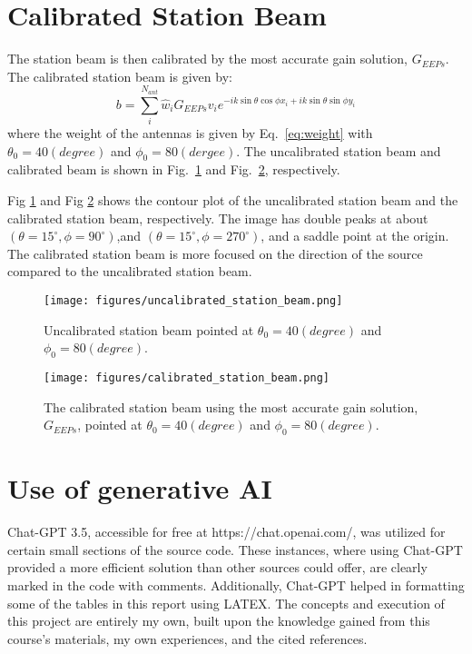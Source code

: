\documentclass[10pt,a4paper,twocolumn]{paper}
\begin{document}
\section{Calibrated Station Beam}
The station beam is then calibrated by the most accurate gain solution, $G_{EEPs}$. The calibrated station beam is given by:
\begin{equation}
    b = \sum_{i}^{N_{ant}} \hat{w}_i G_{EEPs} v_i e^{-ik\sin\theta\cos\phi x_i + ik\sin\theta\sin\phi y_i}
    \label{eq:station_beam}
\end{equation}
where the weight of the antennas is given by Eq.~\ref{eq:weight} with $\theta_0 = 40(degree)$ and $\phi_0 = 80(dergee)$. The uncalibrated station beam and calibrated beam is shown in Fig.~\ref{fig:uncalibrated_station_beam} and Fig.~\ref{fig:calibrated_station_beam}, respectively.

Fig \ref{fig:uncalibrated_station_beam} and Fig \ref{fig:calibrated_station_beam} shows the contour plot of the uncalibrated station beam and the calibrated station beam, respectively. The image has double peaks at about $(\theta = 15^{\circ}, \phi = 90^{\circ})$,and $(\theta = 15^{\circ}, \phi = 270^{\circ})$, and a saddle point at the origin. The calibrated station beam is more focused on the direction of the source compared to the uncalibrated station beam.

\begin{figure}[H]
    \centering
    \texttt{[image: figures/uncalibrated\_station\_beam.png]}
    \caption{Uncalibrated station beam pointed at $\theta_0 = 40(degree)$ and $\phi_0 = 80(degree)$.}
    \label{fig:uncalibrated_station_beam}
\end{figure}

\begin{figure}[H]
    \centering
    \texttt{[image: figures/calibrated\_station\_beam.png]}
    \caption{The calibrated station beam using the most accurate gain solution, $G_{EEPs}$, pointed at $\theta_0 = 40(degree)$ and $\phi_0 = 80(degree).$}
    \label{fig:calibrated_station_beam}
\end{figure}

\clearpage
\appendix
\section{Use of generative AI}
Chat-GPT 3.5, accessible for free at https://chat.openai.com/, was utilized for certain small sections of the source code. These instances, where using Chat-GPT provided a more efficient solution than other sources could offer, are clearly marked in the code with comments. Additionally, Chat-GPT helped in formatting some of the tables in this report using LATEX. The concepts and execution of this project are entirely my own, built upon the knowledge gained from this course's materials, my own experiences, and the cited references.

\printbibliography
\end{document}
